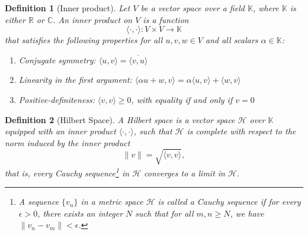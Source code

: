 \documentclass[
	12pt,				%
	oneside,			%
	a4paper,			%
	english,			%
	brazil				%
	]{abntex2ppgsi}
\newtheorem{definition}{Definition}
\begin{document}
\begin{definition}[Inner product]
Let \( V \) be a vector space over a field \( \mathbb{K} \), where \( \mathbb{K} \) is either \( \mathbb{R} \) or \( \mathbb{C} \). An inner product on \( V \) is a function
\[
\langle \cdot, \cdot \rangle : V \times V \to \mathbb{K}
\]
that satisfies the following properties for all \( u, v, w \in V \) and all scalars \( \alpha \in \mathbb{K} \):

\begin{enumerate}
    \item Conjugate symmetry: \( \langle u, v \rangle = \overline{\langle v, u \rangle} \)
    \item Linearity in the first argument: \( \langle \alpha u + w, v \rangle = \alpha \langle u, v \rangle + \langle w, v \rangle \)
    \item Positive-definiteness: \( \langle v, v \rangle \geq 0 \), with equality if and only if \( v = 0 \)
\end{enumerate}
\end{definition}

\begin{definition}[Hilbert Space]
A Hilbert space is a vector space \( \mathcal{H} \) over \( \mathbb{K} \) equipped with an inner product \( \langle \cdot, \cdot \rangle \), such that \( \mathcal{H} \) is complete with respect to the norm induced by the inner product
\[
\|v\| = \sqrt{\langle v, v \rangle},
\]
that is, every Cauchy sequence\footnote{A sequence \( \{v_n\} \) in a metric space \( \mathcal{H} \) is called a \textit{Cauchy sequence} if for every \( \epsilon > 0 \), there exists an integer \( N \) such that for all \( m, n \geq N \), we have \( \| v_n - v_m \| < \epsilon \).} in \( \mathcal{H} \)  converges to a limit in \( \mathcal{H} \).
\end{definition}
\end{document}
